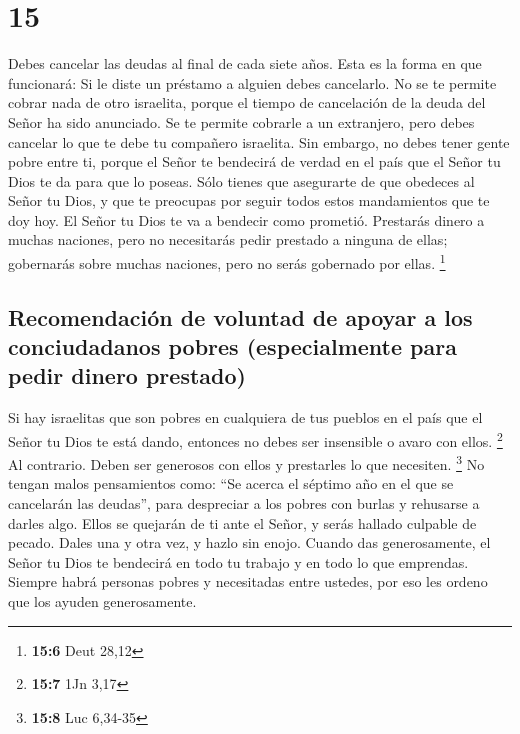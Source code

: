\hypertarget{section-14}{%
\section{15}\label{section-14}}

 Debes cancelar las deudas al final de cada siete años.
 Esta es la forma en que funcionará: Si le diste un
préstamo a alguien debes cancelarlo. No se te permite cobrar nada de
otro israelita, porque el tiempo de cancelación de la deuda del Señor ha
sido anunciado.  Se te permite cobrarle a un extranjero,
pero debes cancelar lo que te debe tu compañero israelita.
 Sin embargo, no debes tener gente pobre entre ti, porque
el Señor te bendecirá de verdad en el país que el Señor tu Dios te da
para que lo poseas.  Sólo tienes que asegurarte de que
obedeces al Señor tu Dios, y que te preocupas por seguir todos estos
mandamientos que te doy hoy.  El Señor tu Dios te va a
bendecir como prometió. Prestarás dinero a muchas naciones, pero no
necesitarás pedir prestado a ninguna de ellas; gobernarás sobre muchas
naciones, pero no serás gobernado por ellas. \footnote{\textbf{15:6}
  Deut 28,12}

\hypertarget{recomendaciuxf3n-de-voluntad-de-apoyar-a-los-conciudadanos-pobres-especialmente-para-pedir-dinero-prestado}{%
\subsection{Recomendación de voluntad de apoyar a los conciudadanos
pobres (especialmente para pedir dinero
prestado)}\label{recomendaciuxf3n-de-voluntad-de-apoyar-a-los-conciudadanos-pobres-especialmente-para-pedir-dinero-prestado}}

 Si hay israelitas que son pobres en cualquiera de tus
pueblos en el país que el Señor tu Dios te está dando, entonces no debes
ser insensible o avaro con ellos. \footnote{\textbf{15:7} 1Jn 3,17}
 Al contrario. Deben ser generosos con ellos y prestarles
lo que necesiten. \footnote{\textbf{15:8} Luc 6,34-35}  No
tengan malos pensamientos como: ``Se acerca el séptimo año en el que se
cancelarán las deudas'', para despreciar a los pobres con burlas y
rehusarse a darles algo. Ellos se quejarán de ti ante el Señor, y serás
hallado culpable de pecado.  Dales una y otra vez, y
hazlo sin enojo. Cuando das generosamente, el Señor tu Dios te bendecirá
en todo tu trabajo y en todo lo que emprendas.  Siempre
habrá personas pobres y necesitadas entre ustedes, por eso les ordeno
que los ayuden generosamente.

